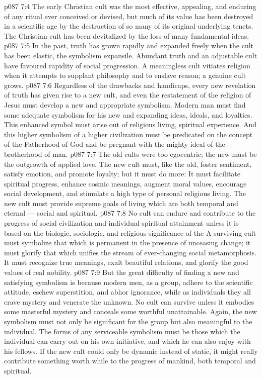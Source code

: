 \vs p087 7:4 The early Christian cult was the most effective, appealing, and enduring of any ritual ever conceived or devised, but much of its value has been destroyed in a scientific age by the destruction of so many of its original underlying tenets. The Christian cult has been devitalized by the loss of many fundamental ideas.
\vs p087 7:5 \pc In the past, truth has grown rapidly and expanded freely when the cult has been elastic, the symbolism expansile. Abundant truth and an adjustable cult have favoured rapidity of social progression. A meaningless cult vitiates religion when it attempts to supplant philosophy and to enslave reason; a genuine cult grows.
\vs p087 7:6 \pc Regardless of the drawbacks and handicaps, every new revelation of truth has given rise to a new cult, and even the restatement of the religion of Jesus must develop a new and appropriate symbolism. Modern man must find some adequate symbolism for his new and expanding ideas, ideals, and loyalties. This enhanced symbol must arise out of religious living, spiritual experience. And this higher symbolism of a higher civilization must be predicated on the concept of the Fatherhood of God and be pregnant with the mighty ideal of the brotherhood of man.
\vs p087 7:7 The old cults were too egocentric; the new must be the outgrowth of applied love. The new cult must, like the old, foster sentiment, satisfy emotion, and promote loyalty; but it must do more: It must facilitate spiritual progress, enhance cosmic meanings, augment moral values, encourage social development, and stimulate a high type of personal religious living. The new cult must provide supreme goals of living which are both temporal and eternal --- social and spiritual.
\vs p087 7:8 No cult can endure and contribute to the progress of social civilization and individual spiritual attainment unless it is based on the biologic, sociologic, and religious significance of the  A surviving cult must symbolize that which is permanent in the presence of unceasing change; it must glorify that which unifies the stream of ever\hyp{}changing social metamorphosis. It must recognize true meanings, exalt beautiful relations, and glorify the good values of real nobility.
\vs p087 7:9 But the great difficulty of finding a new and satisfying symbolism is because modern men, as a group, adhere to the scientific attitude, eschew superstition, and abhor ignorance, while as individuals they all crave mystery and venerate the unknown. No cult can survive unless it embodies some masterful mystery and conceals some worthful unattainable. Again, the new symbolism must not only be significant for the group but also meaningful to the individual. The forms of any serviceable symbolism must be those which the individual can carry out on his own initiative, and which he can also enjoy with his fellows. If the new cult could only be dynamic instead of static, it might really contribute something worth while to the progress of mankind, both temporal and spiritual.
